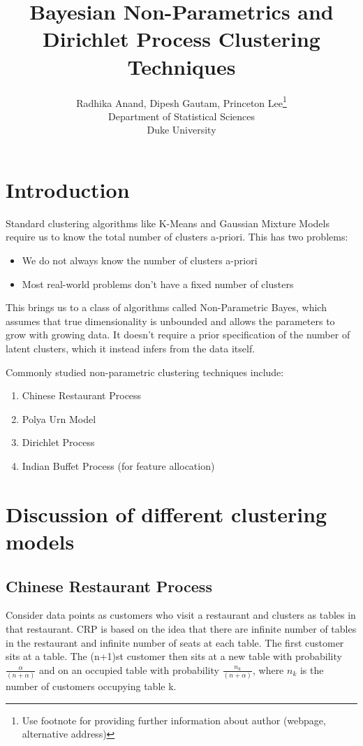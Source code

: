 \documentclass{article} %
\title{Bayesian Non-Parametrics and Dirichlet Process Clustering Techniques}
\author{
Radhika Anand, Dipesh Gautam, Princeton Lee\thanks{ Use footnote for providing further information
about author (webpage, alternative address)} \\
Department of Statistical Sciences\\
Duke University\\
}
\begin{document}
\maketitle

\begin{abstract}

\end{abstract}

\section{Introduction}
Standard clustering algorithms like K-Means and Gaussian Mixture Models require us to know the total number of clusters a-priori. This has two problems:
\begin{itemize}
\item We do not always know the number of clusters a-priori
\item Most real-world problems don’t have a fixed number of clusters
\end{itemize}
This brings us to a class of algorithms called Non-Parametric Bayes, which assumes that true dimensionality is unbounded and allows the parameters to grow with growing data. It doesn’t require a prior specification of the number of latent clusters, which it instead infers from the data itself.

Commonly studied non-parametric clustering techniques include:
\begin{enumerate}
\item Chinese Restaurant Process
\item Polya Urn Model
\item Dirichlet Process
\item Indian Buffet Process (for feature allocation)
\end{enumerate}


\section{Discussion of different clustering models}
\subsection{Chinese Restaurant Process}
Consider data points as customers who visit a restaurant and clusters as tables in that restaurant. CRP is based on the idea that there are infinite number of tables in the restaurant and infinite number of seats at each table. The first customer sits at a table. The (n+1)st customer then sits at a new table with probability $\frac{\alpha}{(n+\alpha)}$ and on an occupied table with probability $\frac{n_k}{(n+\alpha)}$, where $n_k$ is the number of customers occupying table k.
\end{document}

